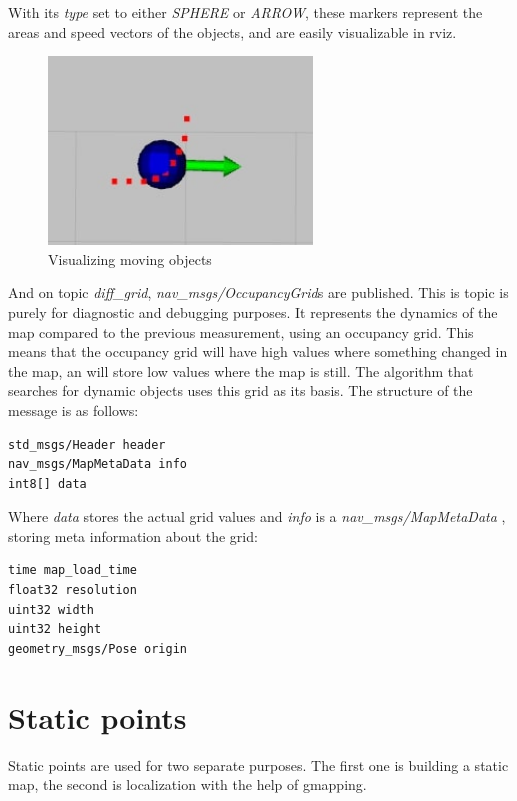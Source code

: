 With its \textit{type} set to either \textit{SPHERE} or \textit{ARROW}, these markers represent the areas and speed vectors of the objects, and are easily visualizable in rviz.

\begin{figure}[!ht]
    \centering
    \includegraphics[height=50mm]{figures/raw/jpeg/rviz_moving_object.jpg}
    \caption{Visualizing moving objects}
    \label{rviz_moving_object}
\end{figure}

And on topic \textit{diff\_grid}, \textit{nav\_msgs/OccupancyGrid}s \cite{ros_msg_OccupancyGrid} are published. This is topic is purely for diagnostic and debugging purposes. It represents the dynamics of the map compared to the previous measurement, using an occupancy grid. This means that the occupancy grid will have high values where something changed in the map, an will store low values where the map is still. The algorithm that searches for dynamic objects uses this grid as its basis. The structure of the message is as follows:

\begin{minipage}{\textwidth}
\begin{lstlisting}[language=IDL]
std_msgs/Header header
nav_msgs/MapMetaData info
int8[] data
\end{lstlisting}
\end{minipage}

Where \textit{data} stores the actual grid values and \textit{info} is a \textit{nav\_msgs/MapMetaData} \cite{ros_msg_MapMetaData}, storing meta information about the grid:

\begin{minipage}{\textwidth}
\begin{lstlisting}[language=IDL]
time map_load_time
float32 resolution
uint32 width
uint32 height
geometry_msgs/Pose origin
\end{lstlisting}
\end{minipage}

\section{Static points}
Static points are used for two separate purposes. The first one is building a static map, the second is localization with the help of gmapping.

